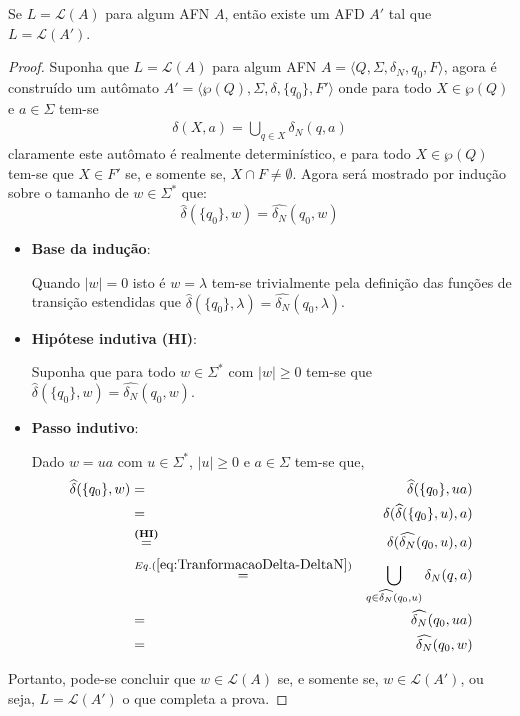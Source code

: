\begin{theorem}\label{teo:AFN-Para-AFD}
	Se $L = \mathcal{L}(A)$ para algum AFN $A$, então existe um AFD $A'$ tal que $L = \mathcal{L}(A')$.
\end{theorem}

\begin{proof}
	Suponha que $L = \mathcal{L}(A)$ para algum AFN $A = \langle Q, \Sigma, \delta_N, q_0, F\rangle$, agora é construído um  autômato $A' = \langle \wp(Q), \Sigma, \delta, \{q_0\}, F' \rangle$ onde para todo $X \in \wp(Q)$ e $a \in \Sigma$ tem-se
	\begin{eqnarray}\label{eq:TranformacaoDelta-DeltaN}
		\delta(X, a) = \bigcup_{q \in X} \delta_N(q, a)
	\end{eqnarray}
	claramente este autômato é realmente determinístico, e para todo $X \in \wp(Q)$  tem-se que $X \in F'$ se, e somente se, $X \cap F \neq \emptyset$. Agora será mostrado por indução sobre o tamanho de $w \in \Sigma^*$ que:
	$$\widehat{\delta}(\{q_0\}, w) = \widehat{\delta_N}(q_0, w)$$
	\begin{itemize}
		\item \textbf{Base da indução}:
		
		Quando $|w| = 0$ isto é $w = \lambda$ tem-se trivialmente pela definição das funções de transição estendidas que $\widehat{\delta}(\{q_0\}, \lambda) = \widehat{\delta_N}(q_0, \lambda)$.
		
		\item \textbf{Hipótese indutiva (HI)}:
		
		Suponha que para todo $w \in \Sigma^*$ com $|w| \geq 0$ tem-se que $\widehat{\delta}(\{q_0\}, w) = \widehat{\delta_N}(q_0, w)$.
		\item \textbf{Passo indutivo}:
		
		Dado $w = ua$ com $u \in \Sigma^*$, $|u| \geq 0$ e $a \in \Sigma$ tem-se que, 
		\begin{eqnarray*}
			\widehat{\delta}(\{q_0\}, w) & = & \widehat{\delta}(\{q_0\}, ua)\\
			& = & \delta(\widehat{\delta}(\{q_0\}, u), a)\\
			& \stackrel{\textbf{(HI)}}{=} & \delta(\widehat{\delta_N}(q_0, u), a)\\
			& \stackrel{Eq. (\ref{eq:TranformacaoDelta-DeltaN})}{=} & \bigcup_{q \in \widehat{\delta_N}(q_0, u)} \delta_N(q, a)\\
			& = & \widehat{\delta_N}(q_0, ua)\\
			& = & \widehat{\delta_N}(q_0, w)
		\end{eqnarray*}
	\end{itemize}
	Portanto, pode-se concluir que $w \in \mathcal{L}(A)$ se, e somente se, $w \in \mathcal{L}(A')$, ou seja, $L = \mathcal{L}(A')$ o que completa a prova.
\end{proof}

